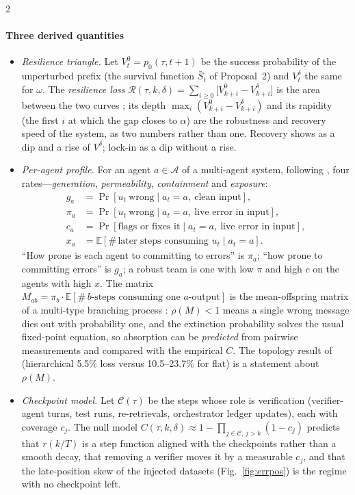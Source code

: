 \begin{multicols}{2}
\paragraph{Three derived quantities}
\begin{itemize}[leftmargin=1.1em]
\item \emph{Resilience triangle.} Let $V^0_t=p_0(\tau,t{+}1)$ be the success probability of the unperturbed prefix (the survival function $\bar S_t$ of Proposal~2) and $V^\delta_t$ the same for $\omega$. The \emph{resilience loss} $\mathcal{R}(\tau,k,\delta)=\sum_{i\ge0}\big[V^0_{k+i}-V^\delta_{k+i}\big]$ is the area between the two curves \cite{bruneau2003resilience}; its depth $\max_i(V^0_{k+i}-V^\delta_{k+i})$ and its rapidity (the first $i$ at which the gap closes to $\alpha$) are the robustness and recovery speed of the system, as two numbers rather than one. Recovery shows as a dip and a rise of $V^\delta$; lock-in as a dip without a rise.
\item \emph{Per-agent profile.} For an agent $a\in\mathcal{A}$ of a multi-agent system, following \cite{hiller2004epic}, four rates---\emph{generation}, \emph{permeability}, \emph{containment} and \emph{exposure}:
\begin{align*}
g_a&=\Pr[u_t\ \text{wrong}\mid a_t{=}a,\ \text{clean input}],\\
\pi_a&=\Pr[u_t\ \text{wrong}\mid a_t{=}a,\ \text{live error in input}],\\
c_a&=\Pr[\text{flags or fixes it}\mid a_t{=}a,\ \text{live error in input}],\\
x_a&=\mathbb{E}[\#\,\text{later steps consuming }u_t\mid a_t{=}a].
\end{align*}
``How prone is each agent to committing to errors'' is $\pi_a$; ``how prone to committing errors'' is $g_a$; a robust team is one with low $\pi$ and high $c$ on the agents with high $x$. The matrix $M_{ab}=\pi_b\cdot\mathbb{E}[\#\,b\text{-steps consuming one }a\text{-output}]$ is the mean-offspring matrix of a multi-type branching process \cite{harris1963branching}: $\rho(M)<1$ means a single wrong message dies out with probability one, and the extinction probability solves the usual fixed-point equation, so absorption can be \emph{predicted} from pairwise measurements and compared with the empirical $C$. The topology result of \citet{huang2024resilience} (hierarchical 5.5\% loss versus 10.5--23.7\% for flat) is a statement about $\rho(M)$.
\item \emph{Checkpoint model.} Let $\mathcal{C}(\tau)$ be the steps whose role is verification (verifier-agent turns, test runs, re-retrievals, orchestrator ledger updates), each with coverage $c_j$. The null model $C(\tau,k,\delta)\approx1-\prod_{j\in\mathcal{C},\,j>k}(1-c_j)$ predicts that $r(k/T)$ is a step function aligned with the checkpoints rather than a smooth decay, that removing a verifier moves it by a measurable $c_j$, and that the late-position skew of the injected datasets (Fig.~\ref{fig:errpos}) is the regime with no checkpoint left.
\end{itemize}
\end{multicols}

